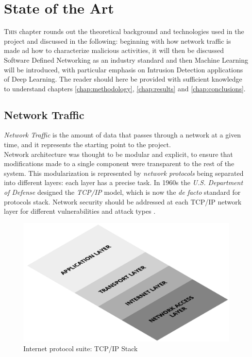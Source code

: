 \chapter{State of the Art}
\label{chap:state-of-the-art}

\lettrine[lines=3, findent=3pt, nindent=0pt]{T}{his} chapter rounds out the theoretical background and technologies used in the project and discussed in the following: beginning with how network traffic is made ad how to characterize malicious activities, it will then be discussed Software Defined Networking as an industry standard and then Machine Learning will be introduced, with particular emphasis on Intrusion Detection applications of Deep Learning. The reader should here be provided with sufficient knowledge to understand chapters \ref{chap:methodology}, \ref{chap:results} and \ref{chap:conclusions}.


\section{Network Traffic}
\label{sec:network-traffic}

\textit{Network Traffic} is the amount of data that passes through a network at a given time, and it represents the starting point to the project. \\ Network architecture was thought to be modular and explicit, to ensure that modifications made to a single component were transparent to the rest of the system. This modularization is represented by \textit{network protocols} being separated into different layers: each layer has a precise task. In 1960s the \textit{U.S. Department of Defense} designed the \textit{TCP/IP} model, which is now the \textit{de facto} standard for protocols stack. Network security should be addressed at each TCP/IP network layer for different vulnerabilities and attack types \cite{Zaman2009}.

\begin{figure}[h!]
    \centering
    \includegraphics[scale=0.23]{figures/TCP_IP Stack.png}
    \caption{Internet protocol suite: TCP/IP Stack}
    \label{fig:TCP/IP-stack}
\end{figure}

